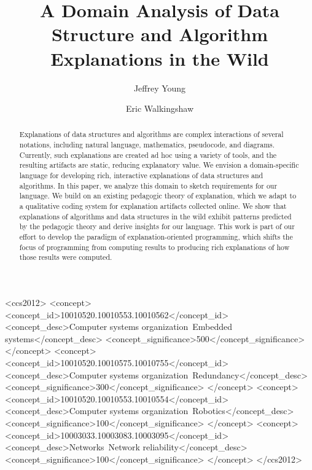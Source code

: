 \documentclass[sigconf]{acmart}
\begin{document}
\title{A Domain Analysis of Data Structure and Algorithm Explanations in the Wild}


\author{Jeffrey Young} 
\author{Eric Walkingshaw} 


\begin{abstract}
Explanations of data structures and algorithms are complex interactions of
several notations, including natural language, mathematics, pseudocode, and
diagrams. Currently, such explanations are created ad hoc using a variety of
tools, and the resulting artifacts are static, reducing explanatory value. We
envision a domain-specific language for developing rich, interactive
explanations of data structures and algorithms. In this paper, we analyze this
domain to sketch requirements for our language. We build on an existing
pedagogic theory of explanation, which we adapt to a qualitative coding system
for explanation artifacts collected online. We show that explanations of
algorithms and data structures in the wild exhibit patterns predicted by the
pedagogic theory and derive insights for our language. This work is part of our
effort to develop the paradigm of explanation-oriented programming, which
shifts the focus of programming from computing results to producing rich
explanations of how those results were computed.
\end{abstract}

%
%
\begin{CCSXML}
<ccs2012>
 <concept>
  <concept_id>10010520.10010553.10010562</concept_id>
  <concept_desc>Computer systems organization~Embedded systems</concept_desc>
  <concept_significance>500</concept_significance>
 </concept>
 <concept>
  <concept_id>10010520.10010575.10010755</concept_id>
  <concept_desc>Computer systems organization~Redundancy</concept_desc>
  <concept_significance>300</concept_significance>
 </concept>
 <concept>
  <concept_id>10010520.10010553.10010554</concept_id>
  <concept_desc>Computer systems organization~Robotics</concept_desc>
  <concept_significance>100</concept_significance>
 </concept>
 <concept>
  <concept_id>10003033.10003083.10003095</concept_id>
  <concept_desc>Networks~Network reliability</concept_desc>
  <concept_significance>100</concept_significance>
 </concept>
</ccs2012>  
\end{CCSXML}
\end{document}
